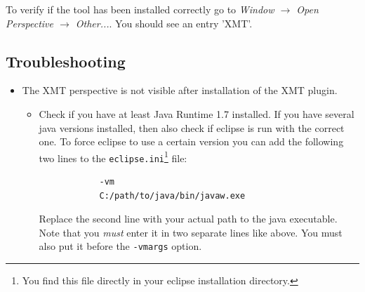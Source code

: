 To verify if the tool has been installed correctly go to \textit{Window $\rightarrow$ Open Perspective $\rightarrow$ Other...}. You should see an entry 'XMT'.

\subsection{Troubleshooting}

\begin{itemize}
	\item The XMT perspective is not visible after installation of the XMT plugin.
	\begin{itemize}
		\item Check if you have at least Java Runtime 1.7 installed.
		If you have several java versions installed, then also check if eclipse is run with the correct one.
		To force eclipse to use a certain version you can add the following two lines to the \texttt{eclipse.ini}\footnote{You find this file directly in your eclipse installation directory.} file:
		\begin{verbatim}
			-vm
			C:/path/to/java/bin/javaw.exe
		\end{verbatim}
		Replace the second line with your actual path to the java executable.
		Note that you \emph{must} enter it in two separate lines like above.
		You must also put it before the \texttt{-vmargs} option.
	\end{itemize}
\end{itemize}